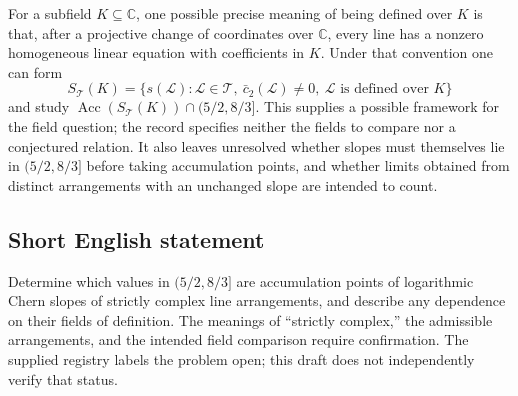 \documentclass[11pt]{article}
\newcommand{\C}{\mathbb{C}}
\begin{document}
For a subfield \(K\subseteq\C\), one possible precise meaning of being defined over \(K\) is that, after a projective change of coordinates over \(\C\), every line has a nonzero homogeneous linear equation with coefficients in \(K\). Under that convention one can form
\[
S_{\mathscr T}(K)=\{s(\mathcal L):\mathcal L\in\mathscr T,\ \bar c_2(\mathcal L)\ne0,\ \mathcal L\text{ is defined over }K\}
\]
and study \(\operatorname{Acc}(S_{\mathscr T}(K))\cap(5/2,8/3]\). This supplies a possible framework for the field question; the record specifies neither the fields to compare nor a conjectured relation. It also leaves unresolved whether slopes must themselves lie in \((5/2,8/3]\) before taking accumulation points, and whether limits obtained from distinct arrangements with an unchanged slope are intended to count.
\subsection{Short English statement}
Determine which values in \((5/2,8/3]\) are accumulation points of logarithmic Chern slopes of strictly complex line arrangements, and describe any dependence on their fields of definition. The meanings of ``strictly complex,'' the admissible arrangements, and the intended field comparison require confirmation. The supplied registry labels the problem open; this draft does not independently verify that status.
\end{document}
